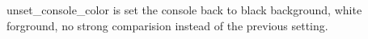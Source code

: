 
\begin{DoxyRefList}
\item[\label{bug__bug000001}%
\hypertarget{bug__bug000001}{}%
File \hyperlink{color_8h}{color.h} ]unset\+\_\+console\+\_\+color is set the console back to black background, white forground, no strong comparision instead of the previous setting. 
\end{DoxyRefList}